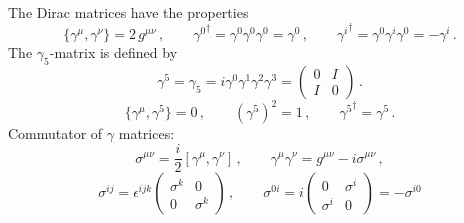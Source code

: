 \documentclass[sort&compress,preprint,3p]{elsarticle}
\begin{document}
The Dirac matrices have the properties
\begin{equation}
\{\gamma^\mu,\gamma^\nu \}
= 2\,g^{\mu\nu} \,,
\quad \quad
{\gamma^0}^\dagger = \gamma^0 \gamma^0 \gamma^0 = \gamma^0 \,,
\quad \quad
{\gamma^i}^\dagger = \gamma^0 \gamma^i \gamma^0 = -\gamma^i \,.
\end{equation}
%
The $\gamma_5$-matrix is defined by
\begin{equation}
\gamma^5 = \gamma_5 = i \gamma^0 \gamma^1 \gamma^2 \gamma^3
= \left( \begin{array}{cc} 0 & I \\ I & 0 \end{array} \right) 
\,.
\end{equation}
\begin{equation}
\{\gamma^\mu,\gamma^5\}=0 \,,
\quad \quad
(\gamma^5)^2 = 1 \,,
\quad \quad
{\gamma^5}^\dagger = \gamma^5 \,.
\end{equation}
Commutator of $\gamma$ matrices:
\begin{equation}
\sigma^{\mu\nu} = \frac{i}{2} \left[\gamma^\mu,\gamma^\nu\right] \,, 
\quad \quad
\gamma^\mu\gamma^\nu = g^{\mu\nu} - i\sigma^{\mu\nu} \,,
\end{equation}
\begin{equation}
\sigma^{ij} = \epsilon^{ijk} 
     \left( \begin{array}{cc} \sigma^k & 0 \\ 0 & \sigma^k \end{array} \right) \,,
\quad \quad
\sigma^{0i} = i\left( \begin{array}{cc} 0 & \sigma^i \\ \sigma^i & 0 \end{array} \right) 
               = -\sigma^{i0}
\end{equation}
\end{document}
